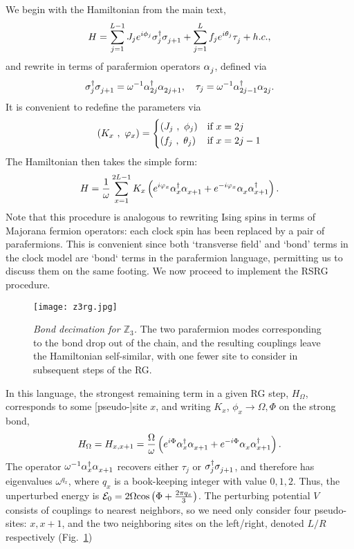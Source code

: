 \documentclass[prb,aps, twocolumn, superscriptaddress]{revtex4-1}
\newcommand{\be}{\begin{eqnarray}}
\newcommand{\ee}{\end{eqnarray}}
\newcommand{\pfC}[0]{\alpha^{\vphantom{\dagger}}}
\newcommand{\pfCconj}[0]{\alpha^{\dagger}}
\begin{document}
\begin{appendix}
We begin with the Hamiltonian from the main text,
\be H = \sum_{j=1}^{L-1} J_j e^{i \phi_j} \sigma^\dagger_j \sigma^{\vphantom{\dagger}}_{j+1} + \sum_{j=1}^{L} f_j e^{i \theta_j} \tau^{\vphantom{\dagger}}_j +h.c., \ee
and rewrite in terms of parafermion operators $\pfC_j$, defined via %
\be \sigma^{\dagger}_j \sigma^{\vphantom{\dagger}}_{j+1} = \omega^{-1} \pfCconj_{2j} \pfC_{2j+1}, \quad \tau_j = \omega^{-1} \pfCconj_{2j-1} \pfC_{2j}.  \ee
It is convenient to redefine the parameters via
\be \left( K_x~,~\varphi_x \right) = \begin{cases} \left( J_j~,~\phi_j \right) & \text{if } x = 2j \notag \\ \left( f_j~,~\theta_j \right) & \text{if } x = 2j-1 \notag \end{cases} \ee
The Hamiltonian then takes the simple form:
\be H = \frac{1}{\omega} \sum_{x=1}^{2L-1}  K_x \left( e^{i \varphi_x} \pfCconj_x \pfC_{x+1} + e^{-i \varphi_x} \pfC_x \pfCconj_{x+1} \right). \ee
%
Note that this procedure is analogous to rewriting Ising spins in terms of Majorana fermion operators: each clock spin has been replaced by a pair of parafermions. This is convenient since both `transverse field' and `bond' terms in the clock model are `bond` terms in the parafermion language, permitting us to discuss them on the same footing. We now proceed to implement the RSRG procedure.
\begin{figure}[t]
\texttt{[image: z3rg.jpg]}
\caption{\label{fig:z3rg} {\it Bond decimation for $\mathbb{Z}_3$.} The two parafermion modes corresponding to the bond drop out of the chain, and the resulting couplings leave the Hamiltonian self-similar, with one fewer site to consider in subsequent steps of the RG.}
\end{figure}


In this language, the strongest remaining term in a given RG step, $H_{\Omega}$, corresponds to some [pseudo-]site $x$, and writing $K_x$, $\phi_x \rightarrow \Omega, \Phi$ on the strong bond,
\be H_{\Omega} = H_{x,x+1}=\frac{\Omega}{\omega} \left( e^{i \Phi} \pfCconj_x \pfC_{x+1} + e^{- i \Phi} \pfC_x \pfCconj_{x+1} \right). \ee
The operator $\omega^{-1} \pfCconj_x \pfC_{x+1} $ recovers either $ \tau_j $ or $\sigma^{\dagger}_j \sigma^{\vphantom{\dagger}}_{j+1}$, and therefore has eigenvalues $\omega^{q_x}$, where $q_x$ is a book-keeping integer with value $0, 1, 2$. Thus, the unperturbed energy is $ \mathcal{E}_0  = 2 \Omega {\rm cos} \left( \Phi + \frac{2 \pi q_x}{3} \right)$.
The perturbing potential $V$ consists of couplings to nearest neighbors, so we need only consider four pseudo-sites: $x,x+1$, and the two neighboring sites on the left/right, denoted $L/R$ respectively (Fig.~\ref{fig:z3rg})


\end{appendix}
\end{document}
